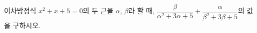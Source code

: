이차방정식 $x^2+x+5=0$의 두 근을 $\alpha$, $\beta$라 할 때, $\dfrac{\beta}{\alpha^2+3\alpha+5}+\dfrac{\alpha}{\beta^2+3\beta+5}$의 값을 구하시오.
